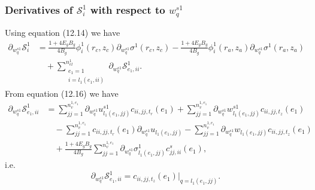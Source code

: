 \documentclass{article}
\begin{document}
\subsubsection{Derivatives of $\mathcal{S}_i^1$ with respect to $w_q^{s1}$} %
Using equation (12.14) we have
\begin{align}
\partial_{w_q^{s1}} \mathcal{S}_i^1 &= \frac{1 + 4 E_g B_g}{4 B_g} \phi_i^1(r_c,z_c) \partial_{w_q^{s1}} \sigma^1(r_c,z_c) - \frac{1 + 4 E_g B_g}{4 B_g} \phi_i^1(r_a,z_a) \partial_{w_q^{s1}} \sigma^1(r_a,z_a) \nonumber\\
&\quad + \sum_{\substack{e_1=1\\ i=l_1(e_1,ii)}}^{n_{el}^1} \partial_{w_q^{s1}} \mathcal{S}_{e_1,ii}^1. \tag{12.28}
\end{align}
From equation (12.16) we have
\begin{align}
\partial_{w_q^{s1}} \mathcal{S}_{e_1,ii}^1 &= \sum_{jj=1}^{n_v^{1,e_1}} \partial_{w_q^{s1}} u_{l_1(e_1,jj)}^{s1} c_{ii,jj,t_r}(e_1) + \sum_{jj=1}^{n_v^{1,e_1}} \partial_{w_q^{s1}} w_{l_1(e_1,jj)}^{s1} c_{ii,jj,t_z}(e_1) \nonumber\\
&\quad - \sum_{jj=1}^{n_v^{1,e_1}} c_{ii,jj,t_r}(e_1) \partial_{w_q^{s1}} u_{l_1(e_1,jj)} - \sum_{jj=1}^{n_v^{1,e_1}} \partial_{w_q^{s1}} w_{l_1(e_1,jj)} c_{ii,jj,t_z}(e_1) \nonumber\\
&\quad + \frac{1 + 4 E_g B_g}{4 B_g} \sum_{jj=1}^{n_v^{1,e_1}} \partial_{w_q^{s1}} \sigma_{l_1(e_1,jj)}^1 c_{jj,ii}^s(e_1), \tag{12.29}
\end{align}
i.e.
\begin{equation}
\partial_{w_q^{s1}} \mathcal{S}_{e_1,ii}^1 = c_{ii,jj,t_z}(e_1) \big|_{q=l_1(e_1,jj)}. \tag{12.30}
\end{equation}
\end{document}
